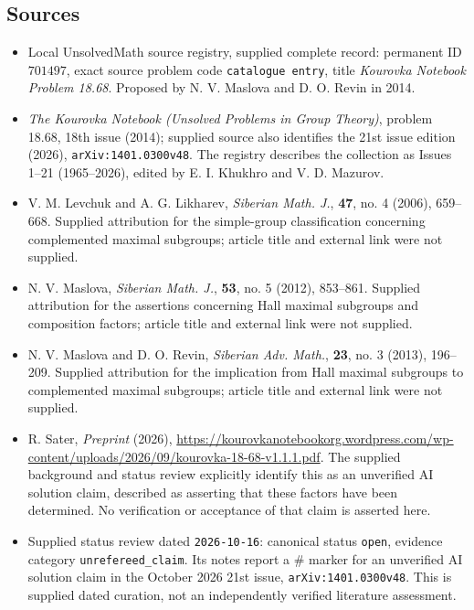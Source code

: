 \documentclass[11pt]{article}
\begin{document}
\subsection{Sources}
\begin{itemize}
\item Local UnsolvedMath source registry, supplied complete record: permanent ID \(701497\), exact source problem code \texttt{catalogue entry}, title \emph{Kourovka Notebook Problem 18.68}. Proposed by N. V. Maslova and D. O. Revin in 2014.
\item \emph{The Kourovka Notebook (Unsolved Problems in Group Theory)}, problem 18.68, 18th issue (2014); supplied source also identifies the 21st issue edition (2026), \texttt{arXiv:1401.0300v48}. The registry describes the collection as Issues 1--21 (1965--2026), edited by E. I. Khukhro and V. D. Mazurov.
\item V. M. Levchuk and A. G. Likharev, \emph{Siberian Math. J.}, \textbf{47}, no. 4 (2006), 659--668. Supplied attribution for the simple-group classification concerning complemented maximal subgroups; article title and external link were not supplied.
\item N. V. Maslova, \emph{Siberian Math. J.}, \textbf{53}, no. 5 (2012), 853--861. Supplied attribution for the assertions concerning Hall maximal subgroups and composition factors; article title and external link were not supplied.
\item N. V. Maslova and D. O. Revin, \emph{Siberian Adv. Math.}, \textbf{23}, no. 3 (2013), 196--209. Supplied attribution for the implication from Hall maximal subgroups to complemented maximal subgroups; article title and external link were not supplied.
\item R. Sater, \emph{Preprint} (2026), \url{https://kourovkanotebookorg.wordpress.com/wp-content/uploads/2026/09/kourovka-18-68-v1.1.1.pdf}. The supplied background and status review explicitly identify this as an unverified AI solution claim, described as asserting that these factors have been determined. No verification or acceptance of that claim is asserted here.
\item Supplied status review dated \texttt{2026-10-16}: canonical status \texttt{open}, evidence category \texttt{unrefereed\_claim}. Its notes report a \(\#\) marker for an unverified AI solution claim in the October 2026 21st issue, \texttt{arXiv:1401.0300v48}. This is supplied dated curation, not an independently verified literature assessment.
\end{itemize}
\end{document}
